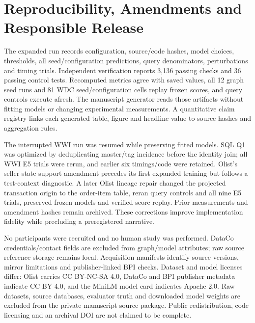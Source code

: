 \documentclass[11pt,letterpaper]{article}
\begin{document}
\section{Reproducibility, Amendments and Responsible Release}
The expanded run records configuration, source/code hashes, model choices, thresholds, all seed/configuration predictions, query denominators, perturbations and timing trials. Independent verification reports 3,136 passing checks and 36 passing control tests. Recomputed metrics agree with saved values, all 12 graph seed runs and 81 WDC seed/configuration cells replay frozen scores, and query controls execute afresh. The manuscript generator reads those artifacts without fitting models or changing experimental measurements. A quantitative claim registry links each generated table, figure and headline value to source hashes and aggregation rules.

The interrupted WWI run was resumed while preserving fitted models. SQL Q1 was optimized by deduplicating master/tag incidence before the identity join; all WWI E5 trials were rerun, and earlier six timings/code were retained. Olist's seller-state support amendment precedes its first expanded training but follows a test-context diagnostic. A later Olist lineage repair changed the projected transaction origin to the order-item table, reran query controls and all nine E5 trials, preserved frozen models and verified score replay. Prior measurements and amendment hashes remain archived. These corrections improve implementation fidelity while precluding a preregistered narrative.

No participants were recruited and no human study was performed. DataCo credentials/contact fields are excluded from graph/model attributes; raw source reference storage remains local. Acquisition manifests identify source versions, mirror limitations and publisher-linked BPI checks. Dataset and model licenses differ: Olist carries CC BY-NC-SA 4.0, DataCo and BPI publisher metadata indicate CC BY 4.0, and the MiniLM model card indicates Apache 2.0. Raw datasets, source databases, evaluator truth and downloaded model weights are excluded from the private manuscript source package. Public redistribution, code licensing and an archival DOI are not claimed to be complete.
\end{document}
